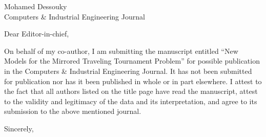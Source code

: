 \documentclass[12pt]{letter}
\begin{document}
\begin{letter}{
Mohamed Dessouky\\
Computers \& Industrial Engineering Journal\\
}

\opening{Dear Editor-in-chief,}

On behalf of my co-author, I am submitting the manuscript entitled ``New Models for the Mirrored Traveling Tournament Problem'' for possible publication in the Computers \& Industrial Engineering Journal. It has not been submitted for publication nor has it been published in whole or in part elsewhere. I attest to the fact that all authors listed on the title page have read the manuscript, attest to the validity and legitimacy of the data and its interpretation, and agree to its submission to the above mentioned journal.

\closing{Sincerely, }

\end{letter}
\end{document}
